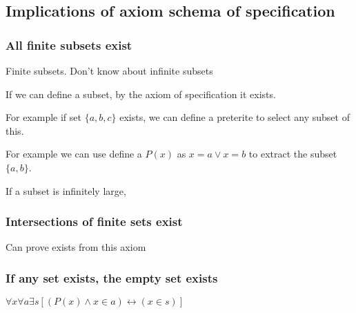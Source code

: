 
\subsection{Implications of axiom schema of specification}

\subsubsection{All finite subsets exist}

Finite subsets. Don't know about infinite subsets

If we can define a subset, by the axiom of specification it exists.

For example if set \(\{a,b,c\}\) exists, we can define a preterite to select any subset of this.

For example we can use define a \(P(x)\) as \(x=a\lor x=b\) to extract the subset \(\{a,b\}\).

If a subset is infinitely large, 

\subsubsection{Intersections of finite sets exist}

Can prove exists from this axiom

\subsubsection{If any set exists, the empty set exists}

$\forall x \forall a \exists s[(P(x)\land x\in a )\leftrightarrow (x\in s)]$

